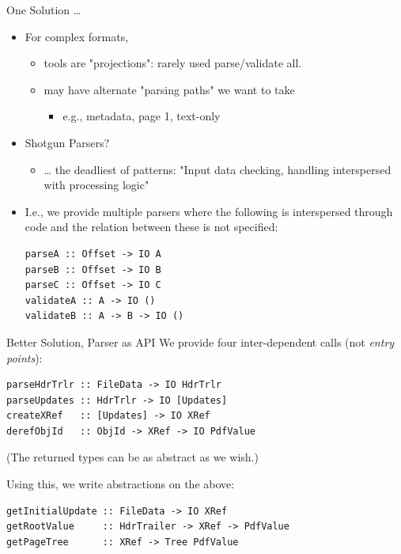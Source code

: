 \documentclass[t,10pt,xcolor={dvipsnames}]{beamer}
\begin{document}
\begin{frame}[label={sec:org101f523},fragile]{One Solution \ldots{}}
 \begin{itemize}
\item For complex formats,
\begin{itemize}
\item tools are "projections": rarely used parse/validate all.
\item may have alternate "parsing paths" we want to take
\begin{itemize}
\item e.g., metadata, page 1, text-only
\end{itemize}
\end{itemize}

\item Shotgun Parsers?
\begin{itemize}
\item \ldots{} the deadliest of patterns: "Input data checking, handling interspersed
with processing logic"
\end{itemize}

\item I.e., we provide multiple parsers where the following is interspersed through
code and the relation between these is \alert{not specified}:
\lstset{language=haskell,label= ,caption= ,captionpos=b,numbers=none}
\begin{lstlisting}
parseA :: Offset -> IO A
parseB :: Offset -> IO B
parseC :: Offset -> IO C
validateA :: A -> IO ()
validateB :: A -> B -> IO ()
\end{lstlisting}
\end{itemize}
\end{frame}

\begin{frame}[label={sec:orge1fd0b9},fragile]{Better Solution, Parser as API}
 We provide four inter-dependent calls (not \emph{entry points}):
\lstset{language=haskell,label= ,caption= ,captionpos=b,numbers=none}
\begin{lstlisting}
parseHdrTrlr :: FileData -> IO HdrTrlr
parseUpdates :: HdrTrlr -> IO [Updates]
createXRef   :: [Updates] -> IO XRef
derefObjId   :: ObjId -> XRef -> IO PdfValue
\end{lstlisting}
(The returned types can be as abstract as we wish.)

\vspace{18pt}

Using this, we write abstractions on the above:
\lstset{language=haskell,label= ,caption= ,captionpos=b,numbers=none}
\begin{lstlisting}
getInitialUpdate :: FileData -> IO XRef
getRootValue     :: HdrTrailer -> XRef -> PdfValue
getPageTree      :: XRef -> Tree PdfValue
\end{lstlisting}
\end{frame}
\end{document}
